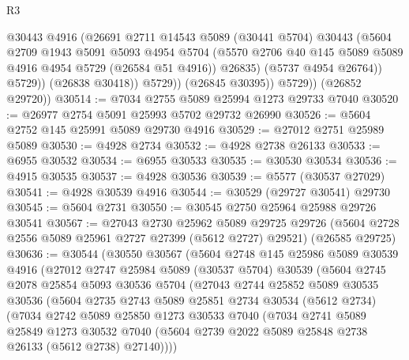 \begin{lexlean}{R3}
\begin{coremodule}
                      @30443
                      @4916
                      (@26691
                        @2711
                        @14543
                        @5089
                        (@30441 @5704)
                        @30443
                        (@5604
                          @2709
                          @1943
                          @5091
                          @5093
                          @4954
                          @5704
                          (@5570 @2706 @40 @145 @5089 @5089 @4916 @4954 @5729 (@26584 @51 @4916))
                          @26835)
                        (@5737 @4954 @26764))
                      @5729))
                  (@26838 @30418))
                @5729))
            (@26845 @30395))
          @5729))
      (@26852 @29720))
@30514 := @7034 @2755 @5089 @25994 @1273 @29733 @7040
@30520 := @26977 @2754 @5091 @25993 @5702 @29732 @26990
@30526 := @5604 @2752 @145 @25991 @5089 @29730 @4916
@30529 := @27012 @2751 @25989 @5089
@30530 := @4928 @2734
@30532 := @4928 @2738 @26133
@30533 := @6955 @30532
@30534 := @6955 @30533
@30535 := @30530 @30534
@30536 := @4915 @30535
@30537 := @4928 @30536
@30539 := @5577 (@30537 @27029)
@30541 := @4928 @30539 @4916
@30544 := @30529 (@29727 @30541) @29730
@30545 := @5604 @2731
@30550 := @30545 @2750 @25964 @25988 @29726 @30541
@30567 := @27043
    @2730
    @25962
    @5089
    @29725
    @29726
    (@5604 @2728 @2556 @5089 @25961 @2727 @27399 (@5612 @2727) @29521)
    (@26585 @29725)
@30636 := @30544
    (@30550
      @30567
      (@5604
        @2748
        @145
        @25986
        @5089
        @30539
        @4916
        (@27012
          @2747
          @25984
          @5089
          (@30537 @5704)
          @30539
          (@5604
            @2745
            @2078
            @25854
            @5093
            @30536
            @5704
            (@27043
              @2744
              @25852
              @5089
              @30535
              @30536
              (@5604
                @2735
                @2743
                @5089
                @25851
                @2734
                @30534
                (@5612 @2734)
                (@7034
                  @2742
                  @5089
                  @25850
                  @1273
                  @30533
                  @7040
                  (@7034
                    @2741
                    @5089
                    @25849
                    @1273
                    @30532
                    @7040
                    (@5604 @2739 @2022 @5089 @25848 @2738 @26133 (@5612 @2738) @27140))))

\end{coremodule}
\end{lexlean}
